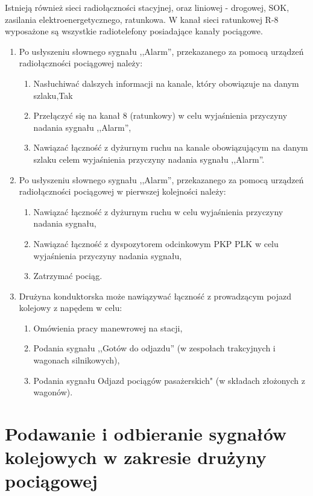 Istnieją również sieci radiołączności stacyjnej, oraz liniowej - drogowej, SOK, zasilania elektroenergetycznego, ratunkowa. W kanał sieci ratunkowej R-8 wyposażone są wszystkie radiotelefony posiadające kanały pociągowe.


\begin{tcolorbox}
	\begin{enumerate}
		\item Po usłyszeniu słownego sygnału ,,Alarm'', przekazanego za pomocą urządzeń radiołączności pociągowej należy:
		\begin{enumerate}
			\item Nasłuchiwać dalszych informacji na kanale, który obowiązuje na danym szlaku,Tak
			\item Przełączyć się na kanał 8 (ratunkowy) w celu wyjaśnienia przyczyny nadania sygnału ,,Alarm'',
			\item Nawiązać łączność z dyżurnym ruchu na kanale obowiązującym na danym szlaku celem wyjaśnienia przyczyny nadania sygnału ,,Alarm''.
		\end{enumerate}
		\item Po usłyszeniu słownego sygnału ,,Alarm'', przekazanego za pomocą urządzeń radiołączności pociągowej w pierwszej kolejności należy:
		\begin{enumerate}
			\item Nawiązać łączność z dyżurnym ruchu w celu wyjaśnienia przyczyny nadania sygnału,
			\item Nawiązać łączność z dyspozytorem odcinkowym PKP PLK w celu wyjaśnienia przyczyny nadania sygnału,
			\item Zatrzymać pociąg.
		\end{enumerate}
		\item Drużyna konduktorska może nawiązywać łączność z prowadzącym pojazd kolejowy z napędem w celu:
		\begin{enumerate}
			\item Omówienia pracy manewrowej na stacji,
			\item Podania sygnału ,,Gotów do odjazdu'' (w zespołach trakcyjnych i wagonach silnikowych),
			\item Podania sygnału Odjazd pociągów pasażerskich" (w składach złożonych z wagonów).
		\end{enumerate} 
	\end{enumerate}
\end{tcolorbox}

\chapter{Podawanie i odbieranie sygnałów kolejowych w zakresie drużyny pociągowej}

